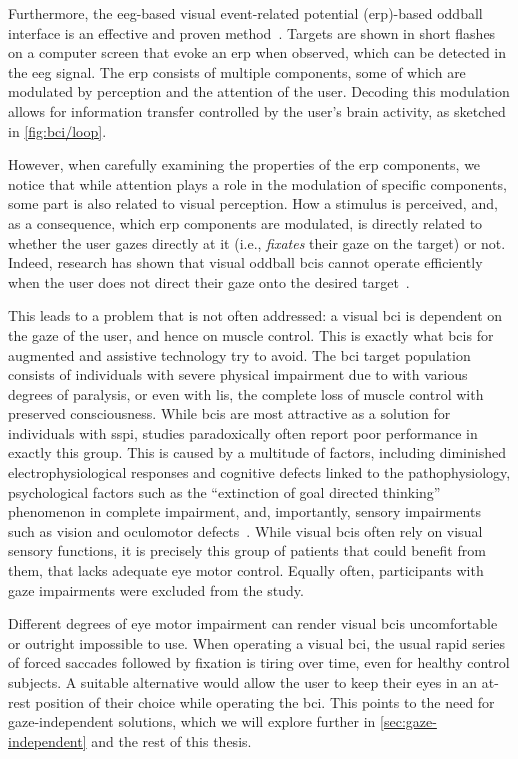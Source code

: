 Furthermore, the \ac{eeg}-based visual event-related potential (\ac{erp})-based oddball
interface is an effective and proven method~\cite{Wolpaw2018,Severens2014}.
Targets are shown in short flashes on a computer screen that evoke an \ac{erp} when
observed, which can be detected in the \ac{eeg} signal.
The \ac{erp} consists of multiple components, some of which are modulated by perception
and the attention of the user.
Decoding this modulation allows for information transfer controlled by the user's brain
activity, as sketched in \cref{fig:bci/loop}.

However, when carefully examining the properties of the \ac{erp} components, we notice
that while attention plays a role in the modulation of specific components, some part is
also related to visual perception.
How a stimulus is perceived, and, as a consequence, which \ac{erp} components are
modulated, is directly related to whether the user gazes directly at it (i.e.,
\emph{fixates} their gaze on the target) or not.
Indeed, research has shown that visual oddball \ac{bci}s cannot operate efficiently when
the user does not direct their gaze onto the desired target~\cite{Brunner2010, Frenzel2011}.

This leads to a problem that is not often addressed:
a visual \ac{bci} is dependent on the gaze of the user, and hence on muscle control.
This is exactly what \acp{bci} for augmented and assistive technology try to avoid.
The \ac{bci} target population consists of individuals with severe physical
impairment due to  with various degrees
of paralysis, or even with \ac{lis}, the complete loss of muscle control with preserved
consciousness.
While \ac{bci}s are most attractive as a solution for individuals with \ac{sspi},
studies paradoxically often report poor performance in exactly this group.
This is caused by a multitude of factors, including diminished
electrophysiological responses and cognitive defects linked to the
pathophysiology, psychological factors such as the ``extinction of goal directed thinking''
phe\-no\-me\-non in complete impairment, and, importantly, sensory impairments such as vision and
oculomotor defects~\cite{Seguin2023}.
While visual \acp{bci} often rely on visual sensory functions, it is precisely this
group of patients that could benefit from them, that lacks adequate eye motor control.
Equally often, participants with gaze impairments were excluded from the study.

Different degrees of eye motor impairment can render visual \ac{bci}s uncomfortable or
outright impossible to use.
When operating a visual \ac{bci}, the usual rapid series of forced saccades followed by
fixation is tiring over time, even for healthy control subjects.
A suitable alternative would allow the user to keep their eyes in an at-rest position of
their choice while operating the \ac{bci}.
This points to the need for gaze-independent solutions, which we will explore further in
\cref{sec:gaze-independent} and the rest of this thesis.
